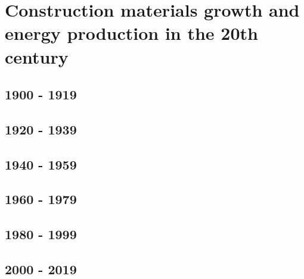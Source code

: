 \section[Construction materials growth and energy production in the 20th century]{Construction materials growth and energy production in the 20th century}
\label{sec:construction_materials_growth_and_energy_production_in_the_20th_century}

\subsection{1900 - 1919}
\label{sec:1900-1919}

\subsection{1920 - 1939}
\label{sec:1900-1919}

\subsection{1940 - 1959}
\label{sec:1900-1919}

\subsection{1960 - 1979}
\label{sec:1900-1919}

\subsection{1980 - 1999}
\label{sec:1900-1919}

\subsection{2000 - 2019}
\label{sec:1900-1919}





